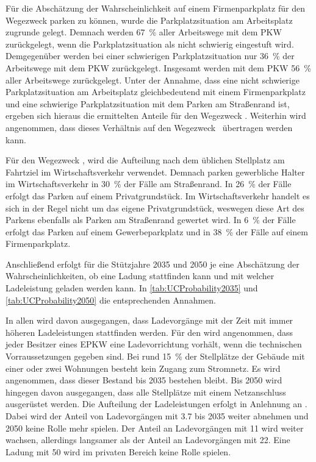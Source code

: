 Für die Abschätzung der Wahrscheinlichkeit auf einem Firmenparkplatz für den Wegezweck \Arbeit parken zu können, wurde die Parkplatzsituation am Arbeitsplatz zugrunde gelegt.
Demnach werden \SI{67}{\percent} aller Arbeitswege mit dem \gls{PKW} zurückgelegt, wenn die Parkplatzsituation als nicht schwierig eingestuft wird.
Demgegenüber werden bei einer schwierigen Parkplatzsituation nur \SI{36}{\percent} der Arbeitswege mit dem \gls{PKW} zurückgelegt.
Insgesamt werden mit dem \gls{PKW} \SI{56}{\percent} aller Arbeitswege zurückgelegt. \cite{Ecke2020}
Unter der Annahme, dass eine nicht schwierige Parkplatzsituation am Arbeitsplatz gleichbedeutend mit einem Firmenparkplatz und eine schwierige Parkplatzsituation mit dem Parken am Straßenrand ist, ergeben sich hieraus die ermittelten Anteile für den Wegezweck \Arbeitdot.
Weiterhin wird angenommen, dass dieses Verhältnis auf den Wegezweck \Ausbildung~übertragen werden kann.\medskip

Für den Wegezweck \dienstdot, wird die Aufteilung nach dem üblichen Stellplatz am Fahrtziel im Wirtschaftsverkehr verwendet. \cite{Rikus2015}
Demnach parken gewerbliche Halter im Wirtschaftsverkehr in \SI{30}{\percent} der Fälle am Straßenrand.
In \SI{26}{\percent} der Fälle erfolgt das Parken auf einem Privatgrundstück.
Im Wirtschaftsverkehr handelt es sich in der Regel nicht um das eigene Privatgrundstück, weswegen diese Art des Parkens ebenfalls als Parken am Straßenrand gewertet wird.
In \SI{6}{\percent} der Fälle erfolgt das Parken auf einem Gewerbeparkplatz und in \SI{38}{\percent} der Fälle auf einem Firmenparkplatz.\medskip

Anschließend erfolgt für die Stützjahre \num{2035} und \num{2050} je \UC eine Abschätzung der Wahrscheinlichkeiten, ob eine Ladung stattfinden kann und mit welcher Ladeleistung geladen werden kann.
In \autoref{tab:UCProbability2035} und \autoref{tab:UCProbability2050} die entsprechenden Annahmen.



In allen \UCs wird davon ausgegangen, dass Ladevorgänge mit der Zeit mit immer höheren Ladeleistungen stattfinden werden.
Für den \UC \Eigenheim wird angenommen, dass jeder Besitzer eines \gls{EPKW} eine Ladevorrichtung vorhält, wenn die technischen Vorraussetzungen gegeben sind.
Bei rund \SI{15}{\percent} der Stellplätze der Gebäude mit einer oder zwei Wohnungen besteht kein Zugang zum Stromnetz.
Es wird angenommen, dass dieser Bestand bis \num{2035} bestehen bleibt.
Bis \num{2050} wird hingegen davon ausgegangen, dass alle Stellplätze mit einem Netzanschluss ausgerüstet werden.
Die Aufteilung der Ladeleistungen erfolgt in Anlehnung an \cite{NPZMAVE2020}.
Dabei wird der Anteil von Ladevorgängen mit \SI{3.7}{\kw} bis \num{2035} weiter abnehmen und \num{2050} keine Rolle mehr spielen.
Der Anteil an Ladevorgängen mit \SI{11}{\kw} wird weiter wachsen, allerdings langsamer als der Anteil an Ladevorgängen mit \SI{22}{\kw}.
Eine Ladung mit \SI{50}{\kw} wird im privaten Bereich keine Rolle spielen.\medskip



